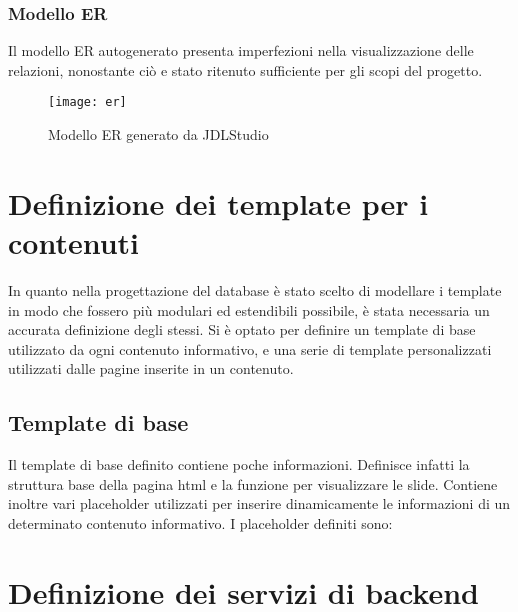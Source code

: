 \subsubsection{Modello ER}
Il modello ER autogenerato presenta imperfezioni nella visualizzazione delle relazioni, nonostante ciò e stato ritenuto sufficiente per gli scopi del progetto.
\begin{figure}[h]
    \begin{center}
    \texttt{[image: er]}
    \caption{Modello ER generato da JDLStudio}
    \label{fig:figure19}
    \end{center}
\end{figure}

\section{Definizione dei template per i contenuti}
In quanto nella progettazione del database è stato scelto di modellare i template in modo che fossero più modulari ed estendibili possibile, è stata necessaria un accurata definizione degli stessi. Si è optato per definire un template di base utilizzato da ogni contenuto informativo, e una serie di template personalizzati utilizzati dalle pagine inserite in un contenuto.
\subsection{Template di base}
Il template di base definito contiene poche informazioni. Definisce infatti la struttura base della pagina html e la funzione per visualizzare le slide. Contiene inoltre vari placeholder utilizzati per inserire dinamicamente le informazioni di un determinato contenuto informativo.
I placeholder definiti sono: 

\section{Definizione dei servizi di backend}

